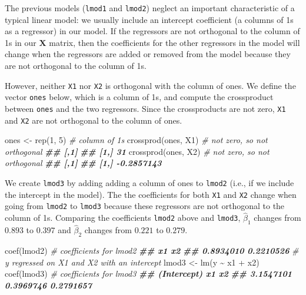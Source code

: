 \documentclass[
]{book}
\newenvironment{Shaded}{\begin{snugshade}}{\end{snugshade}}
\newcommand{\CommentTok}[1]{\textcolor[rgb]{0.56,0.35,0.01}{\textit{#1}}}
\newcommand{\DecValTok}[1]{\textcolor[rgb]{0.00,0.00,0.81}{#1}}
\newcommand{\DocumentationTok}[1]{\textcolor[rgb]{0.56,0.35,0.01}{\textbf{\textit{#1}}}}
\newcommand{\FunctionTok}[1]{\textcolor[rgb]{0.00,0.00,0.00}{#1}}
\newcommand{\NormalTok}[1]{#1}
\newcommand{\OtherTok}[1]{\textcolor[rgb]{0.56,0.35,0.01}{#1}}
\newcommand{\SpecialCharTok}[1]{\textcolor[rgb]{0.00,0.00,0.00}{#1}}
\theoremstyle{definition}
\theoremstyle{definition}
\theoremstyle{definition}
\theoremstyle{definition}
\theoremstyle{remark}
\begin{document}
The previous models (\texttt{lmod1} and \texttt{lmod2}) neglect an important
characteristic of a typical linear model: we usually include an
intercept coefficient (a columns of 1s as a regressor) in our model. If
the regressors are not orthogonal to the column of 1s in our
\(\mathbf{X}\) matrix, then the coefficients for the other regressors in
the model will change when the regressors are added or removed from the
model because they are not orthogonal to the column of 1s.

However, neither \texttt{X1} nor \texttt{X2} is orthogonal with the column of ones. We
define the vector \texttt{ones} below, which is a column of 1s, and compute the
crossproduct between \texttt{ones} and the two regressors. Since the
crossproducts are not zero, \texttt{X1} and \texttt{X2} are not orthogonal to the
column of ones.

\begin{Shaded}
\begin{Highlighting}[]
\NormalTok{ones }\OtherTok{\textless{}{-}} \FunctionTok{rep}\NormalTok{(}\DecValTok{1}\NormalTok{, }\DecValTok{5}\NormalTok{)   }\CommentTok{\# column of 1s}
\FunctionTok{crossprod}\NormalTok{(ones, X1) }\CommentTok{\# not zero, so not orthogonal}
\DocumentationTok{\#\#      [,1]}
\DocumentationTok{\#\# [1,]   31}
\FunctionTok{crossprod}\NormalTok{(ones, X2) }\CommentTok{\# not zero, so not orthogonal}
\DocumentationTok{\#\#            [,1]}
\DocumentationTok{\#\# [1,] {-}0.2857143}
\end{Highlighting}
\end{Shaded}

We create \texttt{lmod3} by adding adding a column of ones to \texttt{lmod2} (i.e., if
we include the intercept in the model). The the coefficients for both
\texttt{X1} and \texttt{X2} change when going from \texttt{lmod2} to \texttt{lmod3} because these
regressors are not orthogonal to the column of 1s. Comparing the
coefficients \texttt{lmod2} above and \texttt{lmod3}, \(\hat{\beta}_1\) changes from
\(0.893\) to \(0.397\) and \(\hat{\beta}_2\) changes from \(0.221\) to \(0.279\).

\begin{Shaded}
\begin{Highlighting}[]
\FunctionTok{coef}\NormalTok{(lmod2) }\CommentTok{\# coefficients for lmod2}
\DocumentationTok{\#\#        x1        x2 }
\DocumentationTok{\#\# 0.8934010 0.2210526}
\CommentTok{\# y regressed on X1 and X2 with an intercept}
\NormalTok{lmod3 }\OtherTok{\textless{}{-}} \FunctionTok{lm}\NormalTok{(y }\SpecialCharTok{\textasciitilde{}}\NormalTok{ x1 }\SpecialCharTok{+}\NormalTok{ x2)}
\FunctionTok{coef}\NormalTok{(lmod3) }\CommentTok{\# coefficients for lmod3}
\DocumentationTok{\#\# (Intercept)          x1          x2 }
\DocumentationTok{\#\#   3.1547101   0.3969746   0.2791657}
\end{Highlighting}
\end{Shaded}
\end{document}
